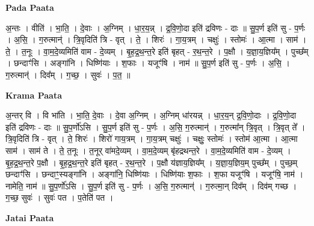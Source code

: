 \documentclass[17pt]{extarticle}
\begin{document}
\textbf{Pada Paata} \newline

अ॒न्तः । वीति॑ । भा॒ति॒ । दे॒वाः । अ॒ग्निम् । धा॒र॒य॒न्न् । द्र॒वि॒णो॒दा इति॑ द्रविणः - दाः ॥ सु॒प॒र्ण इति॑ सु - प॒र्णः । अ॒सि॒ । ग॒रुत्मान्॑ । त्रि॒वृदिति॑ त्रि - वृत् । ते॒ । शिरः॑ । गा॒य॒त्रम् । चक्षुः॑ । स्तोमः॑ । आ॒त्मा । साम॑ । ते॒ । त॒नूः । वा॒म॒दे॒व्यमिति॑ वाम - दे॒व्यम् । बृ॒ह॒द्र॒थ॒न्त॒रे इति॑ बृहत् - र॒थ॒न्त॒रे । प॒क्षौ । य॒ज्ञा॒य॒ज्ञिय᳚म् । पुच्छ᳚म् । छन्दाꣳ॑सि । अङ्गा॑नि । धिष्णि॑याः । श॒फाः । यजूꣳ॑षि । नाम॑ ॥ सु॒प॒र्ण इति॑ सु - प॒र्णः । अ॒सि॒ । ग॒रुत्मान्॑ । दिव᳚म् । ग॒च्छ॒ । सुवः॑ । प॒त॒ ॥  \newline


\textbf{Krama Paata} \newline

अ॒न्तर् वि । वि भा॑ति । भा॒ति॒ दे॒वाः । दे॒वा अ॒ग्निम् । अ॒ग्निम् धा॑रयन्न् । धा॒र॒य॒न् द्र॒वि॒णो॒दाः । द्र॒वि॒णो॒दा इति॑ द्रविणः - दाः ॥ सु॒प॒र्णो॑ऽसि । सु॒प॒र्ण इति॑ सु - प॒र्णः । अ॒सि॒ ग॒रुत्मान्॑ । ग॒रुत्मा᳚न् त्रि॒वृत् । त्रि॒वृत् ते᳚ । त्रि॒वृदिति॑ त्रि - वृत् । ते॒ शिरः॑ । शिरो॑ गाय॒त्रम् । गा॒य॒त्रम् चक्षुः॑ । चक्षुः॒ स्तोमः॑ । स्तोम॑ आ॒त्मा । आ॒त्मा साम॑ । साम॑ ते । ते॒ त॒नूः । त॒नूर् वा॑मदे॒व्यम् । वा॒म॒दे॒व्यम् बृ॑हद्रथन्त॒रे । वा॒म॒दे॒व्यमिति॑ वाम - दे॒व्यम् । बृ॒ह॒द्र॒थ॒न्त॒रे प॒क्षौ । बृ॒ह॒द्र॒थ॒न्त॒रे इति॑ बृहत् - र॒थ॒न्त॒रे । प॒क्षौ य॑ज्ञाय॒ज्ञिय᳚म् । य॒ज्ञा॒य॒ज्ञिय॒म् पुच्छ᳚म् । पुच्छ॒म् छन्दाꣳ॑सि । छन्दाꣳ॒॒स्यङ्गा॑नि । अङ्गा॑नि॒ धिष्णि॑याः । धिष्णि॑याः श॒फाः । श॒फा यजूꣳ॑षि । यजूꣳ॑षि॒ नाम॑ । नामेति॒ नाम॑ ॥ सु॒प॒र्णो॑ऽसि । सु॒प॒र्ण इति॑ सु - प॒र्णः । अ॒सि॒ ग॒रुत्मान्॑ । ग॒रुत्मा॒न् दिव᳚म् । दिव॑म् गच्छ । ग॒च्छ॒ सुवः॑ । सुवः॑ पत । प॒तेति॑ पत । \newline

\textbf{Jatai Paata} \newline
\end{document}
